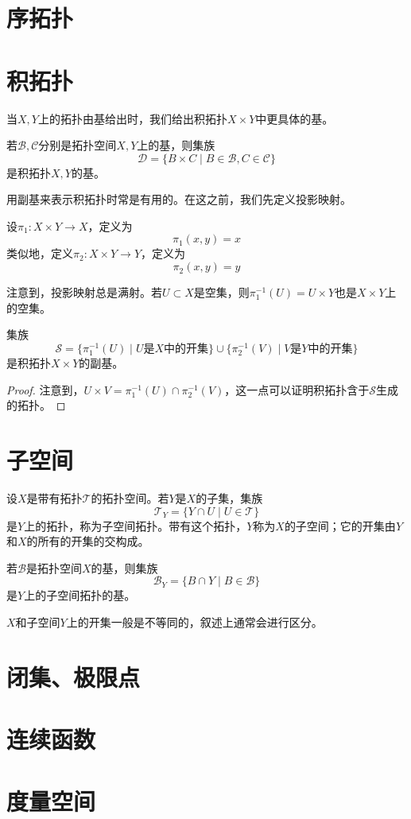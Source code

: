 \documentclass{article}
\newcommand{\ra}{\rightarrow}
\newcommand{\cT}{\mathcal{T}}
\begin{document}
\section{序拓扑}
\section{积拓扑}

当\(X,Y\)上的拓扑由基给出时，我们给出积拓扑\(X\times Y\)中更具体的基。
\begin{theorem}
    若\(\mathcal{B,C}\)分别是拓扑空间\(X,Y\)上的基，则集族\[
    \mathcal D=\{B\times C\mid B\in \mathcal{B},C\in \mathcal{C}  \}
    \]是积拓扑\(X,Y\)的基。
\end{theorem}
用副基来表示积拓扑时常是有用的。在这之前，我们先定义投影映射。\begin{definition}
    设\(\pi_1:X\times Y\ra X\)，定义为\[
    \pi_1(x,y)=x
    \]类似地，定义\(\pi_2:X\times Y\ra Y\)，定义为\[
    \pi_2(x,y)=y
    \]
\end{definition}

注意到，投影映射总是满射。若\(U\subset X\)是空集，则\(\pi_1^{-1}(U)=U\times Y\)也是\(X\times Y\)上的空集。

\begin{theorem}
    集族\[
    \mathcal{S}=\{\pi_1^{-1} (U)\mid U\text{是\(X\)中的开集}\} \cup \{\pi_2^{-1} (V)\mid V\text{是\(Y\)中的开集}\}
    \]
    是积拓扑\(X\times Y\)的副基。
\end{theorem}
\begin{proof}
    注意到，\(U\times V =\pi_1^{-1}(U)\cap \pi^{-1}_2(V)\)，这一点可以证明积拓扑含于\(\mathcal{S}\)生成的拓扑。
\end{proof}
\section{子空间}

\begin{definition}
    设\(X\)是带有拓扑\(\cT\)的拓扑空间。若\(Y\)是\(X\)的子集，集族\[
    \cT_Y=\{Y\cap U \mid U\in \cT\}
    \]是\(Y\)上的拓扑，称为子空间拓扑。带有这个拓扑，\(Y\)称为\(X\)的子空间；它的开集由\(Y\)和\(X\)的所有的开集的交构成。
\end{definition}

\begin{lemma}
    若\(\mathcal{B}\)是拓扑空间\(X\)的基，则集族\[
    \mathcal{B}_Y =\{B\cap Y \mid B\in \mathcal{B} \}
    \]是\(Y\)上的子空间拓扑的基。
\end{lemma}
\(X\)和子空间\(Y\)上的开集一般是不等同的，叙述上通常会进行区分。

\section{闭集、极限点}
\section{连续函数}
\section{度量空间}
\end{document}
